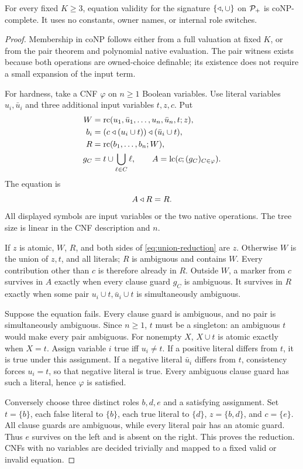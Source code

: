 \begin{proposition}\label{thm:owner-free-hardness}
For every fixed $K\geq3$, equation validity for the signature
$\{\mathbin{\triangleleft},\cup\}$ on $\mathcal P_+$ is coNP-complete. It uses no constants,
owner names, or internal role switches.
\end{proposition}
\begin{proof}
Membership in coNP follows either from a full valuation at fixed $K$,
or from the pair theorem and polynomial native evaluation. The pair
witness exists because both operations are owned-choice definable;
its existence does not require a small expansion of the input term.

For hardness, take a CNF $\varphi$ on $n\geq1$ Boolean variables.
Use literal variables $u_i,\bar u_i$ and three additional input variables
$t,z,c$. Put
\begin{align*}
 W&=\operatorname{rc}(u_1,\bar u_1,\ldots,u_n,\bar u_n,t;z),\\
 b_i&=(c\mathbin{\triangleleft}(u_i\cup t))\mathbin{\triangleleft}(\bar u_i\cup t),\\
 R&=\operatorname{rc}(b_1,\ldots,b_n;W),\\
 g_C&=t\cup\bigcup_{\ell\in C}\ell,\qquad
 A=\operatorname{lc}(c;(g_C)_{C\in\varphi}).
\end{align*}
The equation is
\begin{equation}\label{eq:union-reduction}
 A\mathbin{\triangleleft} R=R.
\end{equation}
All displayed symbols are input variables or the two native operations.
The tree size is linear in the CNF description and $n$.

If $z$ is atomic, $W$, $R$, and both sides of
\eqref{eq:union-reduction} are $z$. Otherwise $W$ is the union of
$z,t$, and all literals; $R$ is ambiguous and contains $W$.
Every contribution other than $c$ is therefore already in $R$.
Outside $W$, a marker from $c$ survives in $A$ exactly when every
clause guard $g_C$ is ambiguous. It survives in $R$ exactly when
some pair $u_i\cup t,\bar u_i\cup t$ is simultaneously ambiguous.

Suppose the equation fails. Every clause guard is ambiguous, and no
pair is simultaneously ambiguous. Since $n\geq1$, $t$ must be a
singleton: an ambiguous $t$ would make every pair ambiguous.
For nonempty $X$, $X\cup t$ is atomic exactly when $X=t$.
Assign variable $i$ true iff $u_i\ne t$. If a positive literal differs
from $t$, it is true under this assignment. If a negative literal
$\bar u_i$ differs from $t$, consistency forces $u_i=t$, so that
negative literal is true. Every ambiguous clause guard has such a
literal, hence $\varphi$ is satisfied.

Conversely choose three distinct roles $b,d,e$ and a satisfying
assignment. Set $t=\{b\}$, each false literal to $\{b\}$, each true
literal to $\{d\}$, $z=\{b,d\}$, and $c=\{e\}$.
All clause guards are ambiguous, while every literal pair has an
atomic guard. Thus $e$ survives on the left and is absent on the
right. This proves the reduction. CNFs with no variables are decided
trivially and mapped to a fixed valid or invalid equation.
\end{proof}

